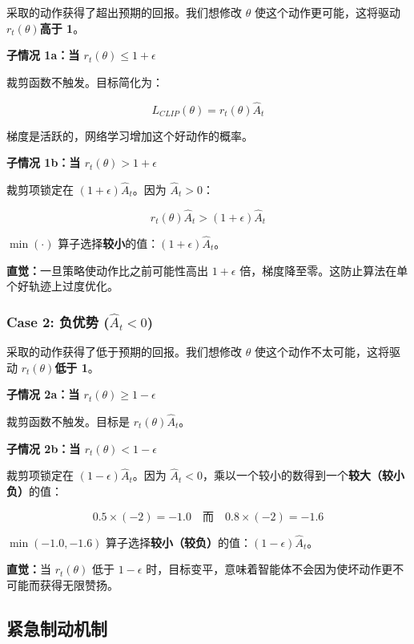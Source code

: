 \documentclass[12pt,a4paper]{article}
\theoremstyle{noteplain}
\theoremstyle{noteexercise}
\begin{document}
采取的动作获得了超出预期的回报。我们想修改 $\theta$ 使这个动作更可能，这将驱动 $r_t(\theta)$\textbf{高于 1}。

\textbf{子情况 1a：当 $r_t(\theta) \leq 1+\epsilon$}

裁剪函数不触发。目标简化为：

\begin{equation}\label{eq:clip-case1a}
  L_{CLIP}(\theta) = r_t(\theta) \hat{A}_t
\end{equation}

梯度是活跃的，网络学习增加这个好动作的概率。

\textbf{子情况 1b：当 $r_t(\theta) > 1+\epsilon$}

裁剪项锁定在 $(1+\epsilon)\hat{A}_t$。因为 $\hat{A}_t > 0$：

\begin{equation}\label{eq:clip-case1b}
  r_t(\theta)\hat{A}_t > (1+\epsilon)\hat{A}_t
\end{equation}

$\min(\cdot)$ 算子选择\textbf{较小}的值：$(1+\epsilon)\hat{A}_t$。

\textbf{直觉：}一旦策略使动作比之前可能性高出 $1+\epsilon$ 倍，梯度降至零。这防止算法在单个好轨迹上过度优化。

\subsubsection{Case 2: 负优势 ($\hat{A}_t < 0$)}

采取的动作获得了低于预期的回报。我们想修改 $\theta$ 使这个动作不太可能，这将驱动 $r_t(\theta)$\textbf{低于 1}。

\textbf{子情况 2a：当 $r_t(\theta) \geq 1-\epsilon$}

裁剪函数不触发。目标是 $r_t(\theta) \hat{A}_t$。

\textbf{子情况 2b：当 $r_t(\theta) < 1-\epsilon$}

裁剪项锁定在 $(1-\epsilon)\hat{A}_t$。因为 $\hat{A}_t < 0$，乘以一个较小的数得到一个\textbf{较大（较小负）}的值：

$$0.5 \times (-2) = -1.0 \quad \text{而} \quad 0.8 \times (-2) = -1.6$$

$\min(-1.0, -1.6)$ 算子选择\textbf{较小（较负）}的值：$(1-\epsilon)\hat{A}_t$。

\textbf{直觉：}当 $r_t(\theta)$ 低于 $1-\epsilon$ 时，目标变平，意味着智能体不会因为使坏动作更不可能而获得无限赞扬。

\subsection{紧急制动机制}
\end{document}
